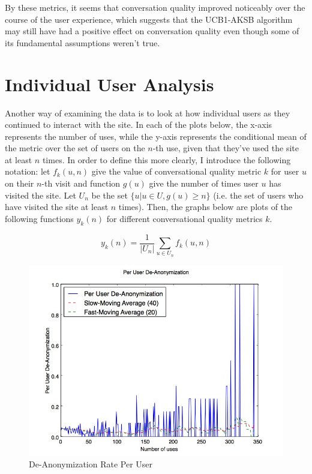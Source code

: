 By these metrics, it seems that conversation quality improved noticeably over the course of the user experience, which suggests that the UCB1-AKSB algorithm may still have had a positive effect on conversation quality even though some of its fundamental assumptions weren't true.

\section{Individual User Analysis}
\label{sec:IndividualUserAnalysis}

Another way of examining the data is to look at how individual users as they continued to interact with the site. In each of the plots below, the x-axis represents the number of uses, while the y-axis represents the conditional mean of the metric over the set of users on the $n$-th use, given that they've used the site at least $n$ times. In order to define this more clearly, I introduce the following notation: let $f_k(u, n)$ give the value of conversational quality metric $k$ for user $u$ on their $n$-th visit and function $g(u)$ give the number of times user $u$ has visited the site. Let $U_n$ be the set $\{u | u \in {U}, g(u) \geq{n}\}$ (i.e. the set of users who have visited the site at least $n$ times). Then, the graphs below are plots of the following functions $y_k(n)$ for different conversational quality metrics $k$.

$$ y_k(n) = \frac{1}{|U_n|}\sum_{u \in U_n}{f_k(u, n)} $$

\begin{figure}[H]
\centering
\includegraphics[trim= 0mm 0mm 0mm 0mm, clip, scale=0.5]{./Figures/PerUserDe-Anonymization.jpg}
\caption{De-Anonymization Rate Per User}
\label{fig:PerUserFBConnect}
\end{figure}

